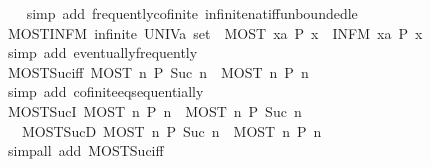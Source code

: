 \begin{isabellebody}
%
\isadelimproof
\ \ %
\endisadelimproof
%
\isatagproof
{}\isamarkupfalse%
\ {\isacharparenleft}simp\ add{\isacharcolon}\ frequently{\isacharunderscore}cofinite\ infinite{\isacharunderscore}nat{\isacharunderscore}iff{\isacharunderscore}unbounded{\isacharunderscore}le{\isacharparenright}%
\endisatagproof
{\isafoldproof}%
%
\isadelimproof
\isanewline
%
\endisadelimproof
\isanewline
{}\isamarkupfalse%
\ MOST{\isacharunderscore}INFM{\isacharcolon}\ {\isachardoublequoteopen}infinite\ {\isacharparenleft}UNIV{\isacharcolon}{\isacharcolon}{\isacharprime}a\ set{\isacharparenright}\ {\isasymLongrightarrow}\ MOST\ x{\isacharcolon}{\isacharcolon}{\isacharprime}a{\isachardot}\ P\ x\ {\isasymLongrightarrow}\ INFM\ x{\isacharcolon}{\isacharcolon}{\isacharprime}a{\isachardot}\ P\ x{\isachardoublequoteclose}\isanewline
%
\isadelimproof
\ \ %
\endisadelimproof
%
\isatagproof
{}\isamarkupfalse%
\ {\isacharparenleft}simp\ add{\isacharcolon}\ eventually{\isacharunderscore}frequently{\isacharparenright}%
\endisatagproof
{\isafoldproof}%
%
\isadelimproof
\isanewline
%
\endisadelimproof
\isanewline
{}\isamarkupfalse%
\ MOST{\isacharunderscore}Suc{\isacharunderscore}iff{\isacharcolon}\ {\isachardoublequoteopen}{\isacharparenleft}MOST\ n{\isachardot}\ P\ {\isacharparenleft}Suc\ n{\isacharparenright}{\isacharparenright}\ {\isasymlongleftrightarrow}\ {\isacharparenleft}MOST\ n{\isachardot}\ P\ n{\isacharparenright}{\isachardoublequoteclose}\isanewline
%
\isadelimproof
\ \ %
\endisadelimproof
%
\isatagproof
{}\isamarkupfalse%
\ {\isacharparenleft}simp\ add{\isacharcolon}\ cofinite{\isacharunderscore}eq{\isacharunderscore}sequentially{\isacharparenright}%
\endisatagproof
{\isafoldproof}%
%
\isadelimproof
\isanewline
%
\endisadelimproof
\isanewline
{}\isamarkupfalse%
\ MOST{\isacharunderscore}SucI{\isacharcolon}\ {\isachardoublequoteopen}MOST\ n{\isachardot}\ P\ n\ {\isasymLongrightarrow}\ MOST\ n{\isachardot}\ P\ {\isacharparenleft}Suc\ n{\isacharparenright}{\isachardoublequoteclose}\isanewline
\ \ \ MOST{\isacharunderscore}SucD{\isacharcolon}\ {\isachardoublequoteopen}MOST\ n{\isachardot}\ P\ {\isacharparenleft}Suc\ n{\isacharparenright}\ {\isasymLongrightarrow}\ MOST\ n{\isachardot}\ P\ n{\isachardoublequoteclose}\isanewline
%
\isadelimproof
\ \ %
\endisadelimproof
%
\isatagproof
{}\isamarkupfalse%
\ {\isacharparenleft}simp{\isacharunderscore}all\ add{\isacharcolon}\ MOST{\isacharunderscore}Suc{\isacharunderscore}iff{\isacharparenright}%
\endisatagproof
{\isafoldproof}%

\end{isabellebody}

